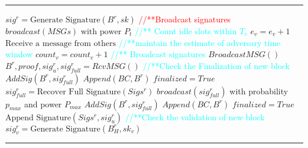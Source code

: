 \documentclass[11pt,a4paper]{article}
\makeatletter
\newenvironment{breakablealgorithm}
{%
	\begin{center}
		\refstepcounter{algorithm}%
		\hrule height.8pt depth0pt \kern2pt%
		\renewcommand{\caption}[2][\relax]{%
			{\raggedright\textbf{\ALG@name~\thealgorithm} ##2\par}%
			\ifx\relax##1\relax %
			\addcontentsline{loa}{algorithm}{\protect\numberline{\thealgorithm}##2}%
			\else %
			\addcontentsline{loa}{algorithm}{\protect\numberline{\thealgorithm}##1}%
			\fi
			\kern2pt\hrule\kern2pt
		}
	}{%
		\kern2pt\hrule\relax%
	\end{center}
}
\makeatother
\begin{document}
\begin{CJK*}{GBK}{song}
\begin{breakablealgorithm}
\begin{algorithmic}[1]
                \State $sig^{r} = \text{Generate Signature}(B^{r}, sk)$
            \EndIf
        \State \textcolor{red}{//**Broadcast signatures}
            \State $broadcast(MSGs)\text{ with power }P_t$
        \Else
            \State \textcolor{cyan}{//** Count idle slots within $T_v$}
            \State $e_v = e_v + 1$
        \Else
            \State $\text{Receive a message from others}$
        \EndIf
    \EndIf
    \State \textcolor{cyan}{//**maintain the estimate of adversary time window}
    \State $count_v = count_v + 1$
        \EndIf
    \EndIf
        \EndIf
    \EndFor 
       \hspace{1cm}
        \State \textcolor{cyan}{//** Broadcast signatures}
        \State $BroadcastMSG()$
        \State $B^r, proof, sig_{u}^{r},sig_{full}^{r} = RcvMSG()$
        \State \textcolor{cyan}{//**Check the Finalization of new block}
            \State $AddSig(B^{r}, sig_{full}^{r})$
            \State $Append(BC, B^{r})$
            \State $finalized = True$
            \State $sig_{full}^{r} = \text{Recover Full Signature}(Sigs^{r})$
            \State $broadcast(sig_{full}^{r})$ with probability $p_{max}$ and power $P_{max}$
            \State $AddSig(B^{r}, sig_{full}^{r})$
            \State $Append(BC, B^{r})$
            \State $finalized = True$
            \State $\text{Append Signature}(Sigs^{r}, sig_{u}^{r})$
        \Else
            \State \textcolor{cyan}{//**Check the validation of new block}
                \State $sig_{v}^{r} = \text{Generate Signature}(B_{H}^{r}, sk_{v})$
            \EndIf
        \EndIf
    \EndWhile
	\end{algorithmic}
\end{breakablealgorithm}

\newpage



\end{CJK*}
\end{document}
